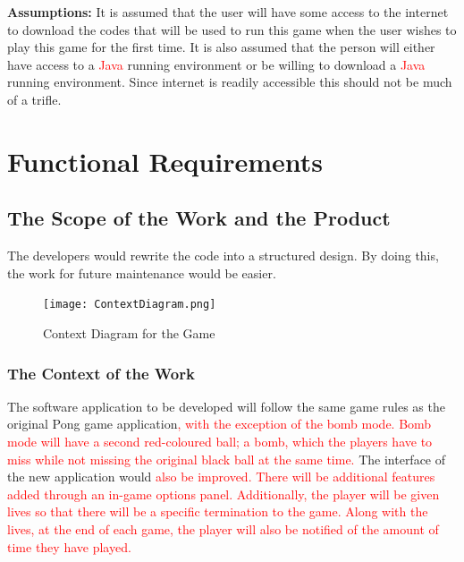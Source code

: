 \documentclass[12pt,letterpaper]{article}
\begin{document}
	\textbf{Assumptions:} It is assumed that the user will have some access to the internet to download the codes that will be used to run this game when the user wishes to play this game for the first time. It is also assumed that the person will either have access to a \textcolor{red}{Java} running environment or be willing to download a \textcolor{red}{Java} running environment. Since internet is readily accessible this should not be much of a trifle.

	
	\section{Functional Requirements}

	\subsection{The Scope of the Work and the Product}
The developers would rewrite the code into a structured design. By doing this, the work for future maintenance would be easier.

\begin{figure}[h]
  \texttt{[image: ContextDiagram.png]}
  \caption{Context Diagram for the Game}
\end{figure}

	\subsubsection{The Context of the Work}
The software application to be developed will follow the same game rules as the original Pong game application\textcolor{red}{, with the exception of the bomb mode. Bomb mode will have a second red-coloured ball; a bomb, which the players have to miss while not missing the original black ball at the same time.} The interface of the new application would \textcolor{red}{also be improved. There will be additional features added through an in-game options panel. Additionally, the player will be given lives so that there will be a specific termination to the game. Along with the lives, at the end of each game, the player will also be notified of the amount of time they have played.}
\end{document}
